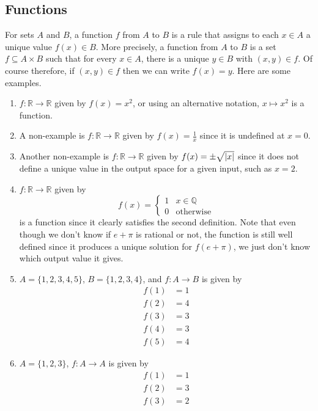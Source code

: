 \subsection{Functions}
For sets $A$ and $B$, a function $f$ from $A$ to $B$ is a rule that assigns to each $x \in A$ a unique value $f(x) \in B$. More precisely, a function from $A$ to $B$ is a set $f \subseteq A \times B$ such that for every $x \in A$, there is a unique $y \in B$ with $(x, y) \in f$. Of course therefore, if $(x, y) \in f$ then we can write $f(x) = y$. Here are some examples.
\begin{enumerate}
	\item $f\colon \mathbb R \to \mathbb R$ given by $f(x) = x^2$, or using an alternative notation, $x \mapsto x^2$ is a function.
	\item A non-example is $f\colon \mathbb R \to \mathbb R$ given by $f(x) = \frac{1}{x}$ since it is undefined at $x=0$.
	\item Another non-example is $f\colon \mathbb R \to \mathbb R$ given by $f(x) = \pm \sqrt{\abs{x}}$ since it does not define a unique value in the output space for a given input, such as $x=2$.
	\item $f\colon \mathbb R \to \mathbb R$ given by
	      \[ f(x) = \begin{cases}
			      1 & x \in \mathbb Q  \\
			      0 & \text{otherwise}
		      \end{cases} \]
	      is a function since it clearly satisfies the second definition. Note that even though we don't know if $e + \pi$ is rational or not, the function is still well defined since it produces a unique solution for $f(e + \pi)$, we just don't know which output value it gives.
	\item $A = \{ 1, 2, 3, 4, 5 \}$, $B = \{ 1, 2, 3, 4 \}$, and $f\colon A \to B$ is given by
	      \begin{align*}
		      f(1) & = 1 \\
		      f(2) & = 4 \\
		      f(3) & = 3 \\
		      f(4) & = 3 \\
		      f(5) & = 4
	      \end{align*}
	\item $A = \{ 1, 2, 3 \}$, $f\colon A \to A$ is given by
	      \begin{align*}
		      f(1) & = 1 \\
		      f(2) & = 3 \\
		      f(3) & = 2

\end{align*}
\end{enumerate}
